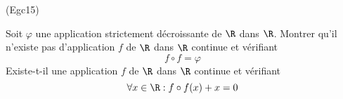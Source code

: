 \begin{tiny}(Egc15)\end{tiny} Soit $\varphi$ une application strictement décroissante de $\R$ dans $\R$. Montrer qu'il n'existe pas d'application $f$ de $\R$ dans $\R$ continue et vérifiant
\begin{displaymath}
 f \circ f = \varphi
\end{displaymath}
Existe-t-il une application $f$ de $\R$ dans $\R$ continue et vérifiant
\begin{displaymath}
 \forall x \in \R : f \circ f (x) +x  = 0
\end{displaymath}